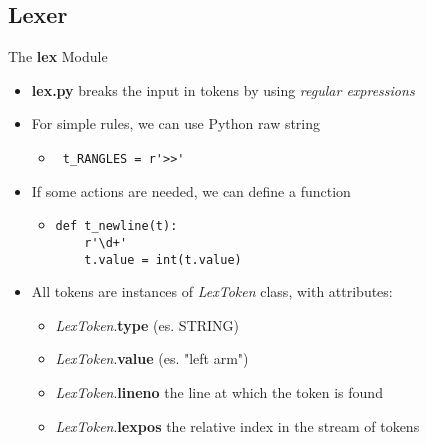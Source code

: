 \subsection{Lexer}
\begin{frame}[fragile]{The \textbf{lex} Module}
  \begin{itemize}
    \item \textbf{lex.py} breaks the input in tokens by using \emph{regular 
    expressions}
\n
    \item For simple rules, we can use Python raw string
    \begin{itemize}
      \item \begin{verbatim} t_RANGLES = r'>>' \end{verbatim}
    \end{itemize}
\n
    \item If some actions are needed, we can define a function
    \begin{itemize}
      \item 
      \begin{verbatim} 
def t_newline(t):
    r'\d+'
    t.value = int(t.value) \end{verbatim}
    \end{itemize}
\n
    \item All tokens are instances of \emph{LexToken} class, with attributes:
    \begin{itemize}
      \item \emph{LexToken}.\textbf{type} \tab (es. STRING)
      \item \emph{LexToken}.\textbf{value} \tab (es. "left arm")
      \item \emph{LexToken}.\textbf{lineno} \tab the line at which the token 
      is found
      \item \emph{LexToken}.\textbf{lexpos} \tab the relative index in the stream of tokens
    \end{itemize}
  \end{itemize}
%
%
\N\N
\end{frame}


